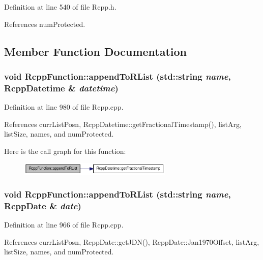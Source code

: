 Definition at line 540 of file Rcpp.h.

References numProtected.

\subsection{Member Function Documentation}
\hypertarget{classRcppFunction_a0be4ab064287c2d3a5c3b883a1707d70}{
\subsubsection[{appendToRList}]{\setlength{\rightskip}{0pt plus 5cm}void RcppFunction::appendToRList (std::string {\em name}, \/  {\bf RcppDatetime} \& {\em datetime})}}
\label{classRcppFunction_a0be4ab064287c2d3a5c3b883a1707d70}


Definition at line 980 of file Rcpp.cpp.

References currListPosn, RcppDatetime::getFractionalTimestamp(), listArg, listSize, names, and numProtected.

Here is the call graph for this function:\nopagebreak
\begin{figure}[H]
\begin{center}
\leavevmode
\includegraphics[width=207pt]{classRcppFunction_a0be4ab064287c2d3a5c3b883a1707d70_cgraph}
\end{center}
\end{figure}
\hypertarget{classRcppFunction_a9aab0b3accb81d90fb813acf3bf4c49d}{
\subsubsection[{appendToRList}]{\setlength{\rightskip}{0pt plus 5cm}void RcppFunction::appendToRList (std::string {\em name}, \/  {\bf RcppDate} \& {\em date})}}
\label{classRcppFunction_a9aab0b3accb81d90fb813acf3bf4c49d}


Definition at line 966 of file Rcpp.cpp.

References currListPosn, RcppDate::getJDN(), RcppDate::Jan1970Offset, listArg, listSize, names, and numProtected.


